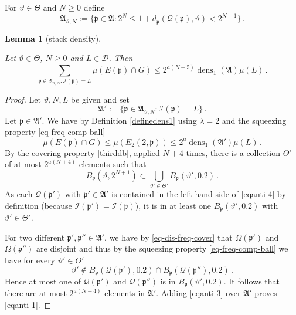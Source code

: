 \documentclass[10pt,a4paper]{article}
\theoremstyle{plain}
\newtheorem{lemma}[theorem]{Lemma}
\theoremstyle{definition}
\numberwithin{equation}{subsection}
\DeclareMathOperator{\dens}{\operatorname{dens}}
\newcommand{\fp}{{\mathfrak p}}
\newcommand{\fc}{{\Omega}}
\newcommand{\scI}{{\mathcal{I}}} %
\newcommand{\mfa}{{\vartheta}}
\newcommand{\Mf}{{\Theta}}
\newcommand{\fcc}{{\mathcal{Q}}}
\newcommand{\lean}[1]{}
\newcommand{\leanok}{}
\begin{document}
For $\mfa \in \Mf$ and $N\ge 0$ define
\begin{equation}\label{eqantidefap}
    \mathfrak{A}_{\mfa,N}:=\{\fp\in\mathfrak{A}: 2^{N}\le 1+d_{\fp}(\fcc(\fp), \mfa) < 2^{N+1}\} \, .
\end{equation}


\begin{lemma}[stack density]
\label{stack-density}
\leanok
\lean{Antichain.stack_density}
Let $\mfa \in \Mf$, $N\ge 0$ and
$L\in \mathcal{D}$. Then
\begin{equation}\label{eqanti-1}
    \sum_{\fp\in\mathfrak{A}_{\mfa,N}:\scI(\fp)=L}\mu(E(\fp)\cap G)\le 2^{a(N+5)}\dens_1(\mathfrak{A})\mu(L)\, .
\end{equation}
\end{lemma}
\begin{proof}
\leanok
Let $\mfa,N,L$ be given and set
\begin{equation}
\mathfrak{A}':=\{\fp\in\mathfrak{A}_{\mfa,N}:\scI(\fp)=L\}\, .
\end{equation}
Let
$\fp\in\mathfrak{A}'$.
We have
by Definition \eqref{definedens1}
using $\lambda=2$ and the squeezing property \eqref{eq-freq-comp-ball}
\begin{equation}\label{eqanti-3}
\mu(E(\fp)\cap G)\le \mu(E_2(2, \fp))\le 2^{a}\dens_1(\mathfrak{A}')\mu(L)\, .
\end{equation}
By the covering property \eqref{thirddb}, applied $N+4$ times, there is a collection $\Mf'$ of at most $2^{a(N+4)}$
elements such that
\begin{equation}\label{eqanti-4}
    B_{\fp}(\mfa, 2^{N+1})\subset \bigcup_{\mfa'\in \Mf'}
    B_{\fp}(\mfa', 0.2)\, .
\end{equation}
As each $\fcc(\fp')$ with $\fp'\in \mathfrak{A}'$
is contained in the left-hand-side
of \eqref{eqanti-4}
by definition (because $\scI(\fp') = \scI(\fp))$, it is in at least one $B_{\fp}(\mfa', 0.2)$
with $\mfa'\in \Mf'$.


For two different $\fp',\fp''\in \mathfrak{A}'$, we have by
\eqref{eq-dis-freq-cover} that
$\fc(\fp')$ and $\fc(\fp'')$ are disjoint and thus by the squeezing property \eqref{eq-freq-comp-ball} we have for every $\mfa'\in \Mf'$
\begin{equation}
    \mfa'\not\in B_{\fp}(\fcc(\fp'), 0.2)\cap
B_{\fp}(\fcc(\fp''), 0.2)\, .
\end{equation}
Hence at most one of $\fcc(\fp')$
and $\fcc(\fp'')$ is in
$B_{\fp}(\mfa', 0.2)$.
It follows that there are at most $2^{a(N+4)}$ elements in
$\mathfrak{A}'$. Adding \eqref{eqanti-3} over $\mathfrak{A}'$ proves
\eqref{eqanti-1}.
\end{proof}
\end{document}
